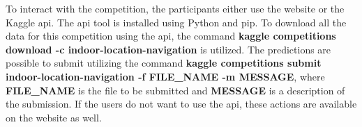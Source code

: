To interact with the competition, the participants either use the website or the Kaggle \gls{api}. The \gls{api} tool is installed using Python and \gls{pip}. To download all the data for this competition using the \gls{api}, the command \textbf{kaggle competitions download -c indoor-location-navigation} is utilized. The predictions are possible to submit utilizing the command \textbf{kaggle competitions submit indoor-location-navigation -f FILE\_NAME -m MESSAGE}, where \textbf{FILE\_NAME} is the file to be submitted and \textbf{MESSAGE} is a description of the submission.\cite{KaggleAPI} If the users do not want to use the \gls{api}, these actions are available on the website as well.